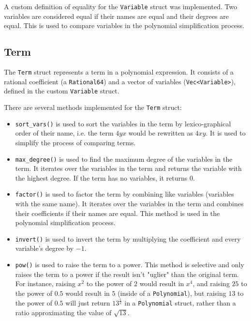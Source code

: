 A custom definition of equality for the \verb|Variable| struct was implemented. Two variables are considered equal if their names are equal and their degrees are equal. This is used to compare variables in the polynomial simplification process.

\subsection{Term}\label{subsec:term}

The \verb|Term| struct represents a term in a polynomial expression. It consists of a rational coefficient (a \verb|Rational64|) and a vector of variables (\verb|Vec<Variable>|), defined in the custom \texttt{Variable} struct.

There are several methods implemented for the \verb|Term| struct:

\begin{itemize}
    \item \verb|sort_vars()| is used to sort the variables in the term by lexico-graphical order of their name, i.e. the term $4yx$ would be rewritten as $4xy$. It is used to simplify the process of comparing terms.
    \item \verb|max_degree()| is used to find the maximum degree of the variables in the term. It iterates over the variables in the term and returns the variable with the highest degree. If the term has no variables, it returns $0$.
    \item \verb|factor()| is used to factor the term by combining like variables (variables with the same name). It iterates over the variables in the term and combines their coefficients if their names are equal. This method is used in the polynomial simplification process.
    \item \verb|invert()| is used to invert the term by multiplying the coefficient and every variable's degree by $-1$.
    \item \verb|pow()| is used to raise the term to a power. This method is selective and only raises the term to a power if the result isn't "uglier" than the original term. For instance, raising $x^2$ to the power of $2$ would result in $x^4$, and raising $25$ to the power of $0.5$ would result in $5$ (inside of a \verb|Polynomial|), but raising $13$ to the power of $0.5$ will just return $13^{\frac{1}{2}}$ in a \verb|Polynomial| struct, rather than a ratio approximating the value of $\sqrt{13}$.
\end{itemize}

